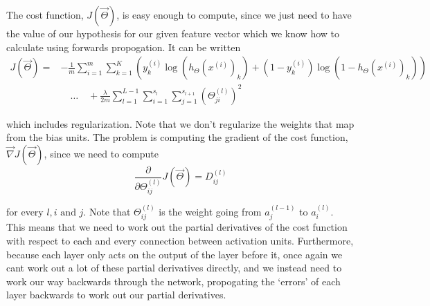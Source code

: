 \vspace{1em}

The cost function, $J(\vec{\Theta})$, is easy enough to compute, since we just need to have the value of our hypothesis for our given feature vector which we
know how to calculate using forwards propogation. It can be written\begin{align}
    J(\vec{\Theta}) = &- \frac{1}{m} \sum^{m}_{i=1}\sum^{K}_{k=1} \left( y^{(i)}_k \log{\left(h_{\Theta}(x^{(i)})_k\right)} + \left(1 - y^{(i)}_k\right) \log{\left(1-h_{\Theta}(x^{(i)})_k\right)} \right) \\
    &\quad\hdots\quad + \frac{\lambda}{2m} \sum^{L-1}_{l=1} \sum^{s_l}_{i=1}\sum^{s_{l+1}}_{j=1} \left(\Theta^{(l)}_{ji}\right)^2 \nonumber
\end{align}

which includes regularization. Note that we don't regularize the weights that map from the bias units.
The problem is computing the gradient of the cost function, $\vec{\nabla} J(\vec{\Theta})$, since we need to compute
\begin{equation}
    \frac{\partial}{\partial \Theta^{(l)}_{ij}} J(\vec{\Theta}) = D^{(l)}_{ij}
\end{equation}

for every $l, i \textrm{ and } j$. Note that $\Theta^{(l)}_{ij}$ is the weight going from $a^{(l-1)}_j$ to $a^{(l)}_i$. This means that we need to work out the
partial derivatives of the cost function with respect to each and every connection between activation units. Furthermore, because each layer only acts on the output
of the layer before it, once again we cant work out a lot of these partial derivatives directly, and we instead need to work our way backwards through the network,
propogating the `errors' of each layer backwards to work out our partial derivatives.

\vspace{1em}

